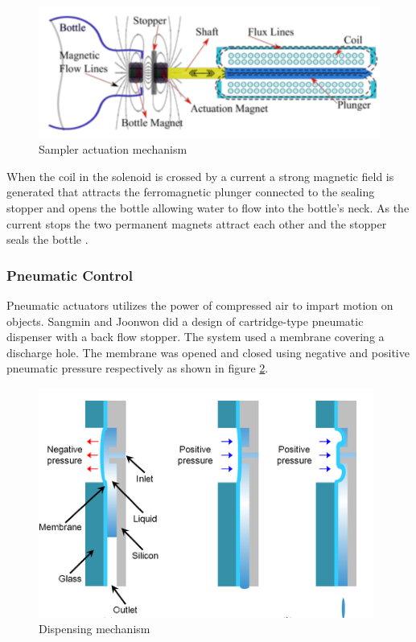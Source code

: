 \begin{figure}[H]
    \centering
    \includegraphics[width=\textwidth]{Figures/stopper.jpg}
    \caption[Sampler actuation mechanism]{Sampler actuation mechanism \cite{odetti2019design}}
    \label{fig:stopper}
\end{figure}

When the coil in the solenoid is crossed by a current a strong magnetic field is generated that attracts the ferromagnetic plunger connected to the sealing stopper and opens the bottle allowing water to flow into the bottle's neck. As the current stops the two permanent magnets attract each other and the stopper seals the bottle \cite{odetti2019design}.

\subsubsection{Pneumatic Control}
Pneumatic actuators utilizes the power of compressed air to impart motion on objects. Sangmin and Joonwon \cite{lee2009development} did a design of cartridge-type pneumatic dispenser with a back flow stopper. The system used a membrane covering a discharge hole. The membrane was opened and closed using negative and positive pneumatic pressure respectively as shown in figure \ref{fig:dispensing_mechanisml}. 

\begin{figure}
    \centering
    \includegraphics{Figures/dispensing_mechanism.png}
    \caption[Dispensing mechanism]{Dispensing mechanism \cite{lee2009development}}
    \label{fig:dispensing_mechanisml}
\end{figure}

